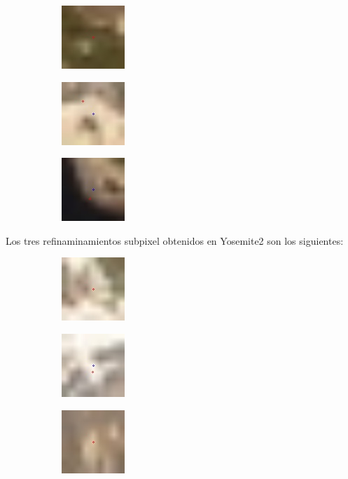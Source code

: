 \documentclass[10pt,a4paper]{article}
\begin{document}
\begin{figure}[h]
\begin{subfigure}{0.33\textwidth}
	\includegraphics[height=90px,width=90px]{yosemite1_subpixel1}
\end{subfigure}
\begin{subfigure}{0.33\textwidth}
	\includegraphics[height=90px,width=90px]{yosemite1_subpixel2}
\end{subfigure}
\begin{subfigure}{0.33\textwidth}
	\includegraphics[height=90px,width=90px]{yosemite1_subpixel3}
\end{subfigure}
\end{figure}

Los tres refinaminamientos subpixel obtenidos en Yosemite2 son los siguientes:

\begin{figure}[h]
	\begin{subfigure}{0.33\textwidth}
		\includegraphics[height=90px,width=90px]{yosemite2_subpixel1}
	\end{subfigure}
	\begin{subfigure}{0.33\textwidth}
		\includegraphics[height=90px,width=90px]{yosemite2_subpixel2}
	\end{subfigure}
	\begin{subfigure}{0.33\textwidth}
		\includegraphics[height=90px,width=90px]{yosemite2_subpixel3}
	\end{subfigure}
\end{figure}
\end{document}
